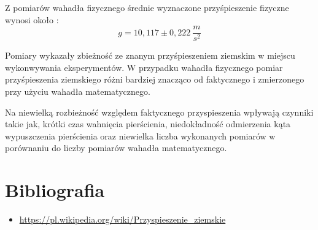 \documentclass[12pt]{article}
\begin{document}
Z pomiarów wahadła fizycznego średnie wyznaczone przyśpieszenie fizyczne wynosi około :
$$ g = 10,117 \pm 0,222 \ \frac{m}{s^2} $$

Pomiary wykazały zbieżność ze znanym przyśpieszeniem ziemskim w miejscu wykonwywania eksperymentów. W przypadku wahadła 
fizycznego pomiar przyśpieszenia ziemskiego różni bardziej znacząco od faktycznego i zmierzonego przy użyciu wahadła matematycznego.

Na niewielką rozbieżność względem faktycznego przyspieszenia wpływają czynniki takie jak, krótki czas wahnięcia pierścienia,
niedokładność odmierzenia kąta wypuszczenia pierścienia oraz niewielka liczba wykonanych pomiarów w porównaniu do liczby pomiarów wahadła matematycznego. \\

\section{Bibliografia}
\begin{itemize}
    \item \url{https://pl.wikipedia.org/wiki/Przyspieszenie_ziemskie}
\end{itemize}
\end{document}
